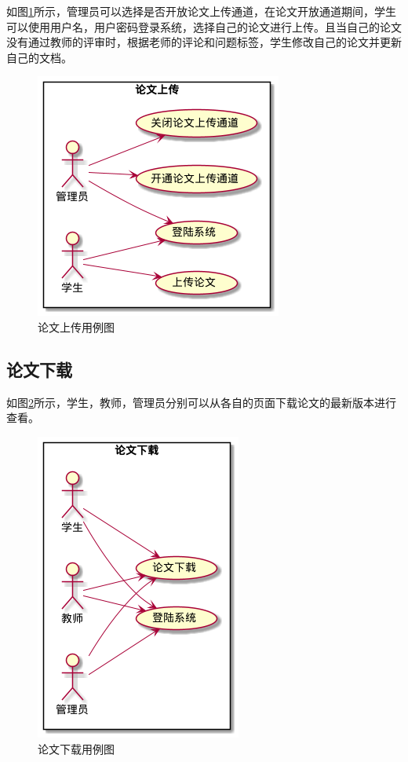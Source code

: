 如图\ref{upload-usecase}所示，管理员可以选择是否开放论文上传通道，在论文开放通道期间，学生可以使用用户名，用户密码登录系统，选择自己的论文进行上传。且当自己的论文没有通过教师的评审时，根据老师的评论和问题标签，学生修改自己的论文并更新自己的文档。

\begin{figure}[htbp]
      \centering
      \includegraphics[scale = 0.75]{out/uml/用例图/2-论文上传/2-论文上传.png}
      \caption{\song\wuhao 论文上传用例图}
      \label{upload-usecase}
\end{figure}

\subsection{论文下载}

如图\ref{download-usecase}所示，学生，教师，管理员分别可以从各自的页面下载论文的最新版本进行查看。

\begin{figure}[htbp]
      \centering
      \includegraphics[scale = 0.75]{out/uml/用例图/5-论文下载/5-论文下载.png}
      \caption{\song\wuhao 论文下载用例图}
      \label{download-usecase}
\end{figure}

